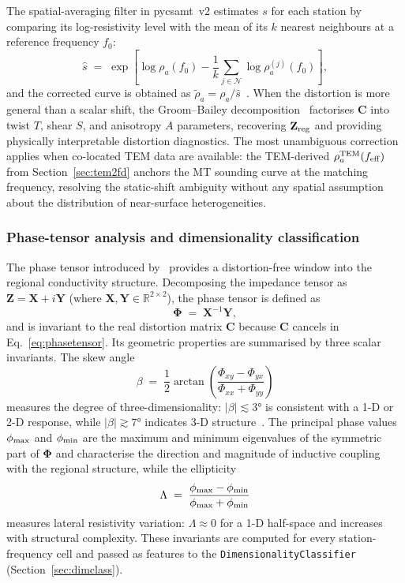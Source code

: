 \documentclass[review,12pt]{elsarticle}
\begin{document}
The spatial-averaging filter in pycsamt~v2 estimates $s$ for each station
by comparing its log-resistivity level with the mean of its $k$ nearest
neighbours at a reference frequency $f_0$:
\begin{equation}
  \hat{s} \;=\;
  \exp\!\left[
    \log\rho_a(f_0) -
    \frac{1}{k}\sum_{j\in\mathcal{N}}\log\rho_a^{(j)}(f_0)
  \right],
  \label{eq:sshat}
\end{equation}
and the corrected curve is obtained as
$\tilde{\rho}_a = \rho_a/\hat{s}$~\citep{Kouadio2023}.
When the distortion is more general than a scalar shift, the
Groom--Bailey decomposition~\citep{Groometal1989} factorises $\mathbf{C}$
into twist $T$, shear $S$, and anisotropy $A$ parameters, recovering
$\mathbf{Z}_{\rm reg}$ and providing physically interpretable distortion
diagnostics.
The most unambiguous correction applies when co-located TEM data are
available: the TEM-derived $\rho_a^{\rm TEM}(f_{\rm eff})$ from
Section~\ref{sec:tem2fd} anchors the MT sounding curve at the matching
frequency, resolving the static-shift ambiguity without any spatial
assumption about the distribution of near-surface heterogeneities.

\subsubsection{Phase-tensor analysis and dimensionality classification}

The phase tensor introduced by~\citet{Caldwell2004} provides a
distortion-free window into the regional conductivity structure.
Decomposing the impedance tensor as $\mathbf{Z} = \mathbf{X} + i\mathbf{Y}$
(where $\mathbf{X},\mathbf{Y}\in\mathbb{R}^{2\times2}$), the phase tensor
is defined as
\begin{equation}
  \boldsymbol\Phi \;=\; \mathbf{X}^{-1}\mathbf{Y},
  \label{eq:phasetensor}
\end{equation}
and is invariant to the real distortion matrix $\mathbf{C}$ because
$\mathbf{C}$ cancels in Eq.~\eqref{eq:phasetensor}.
Its geometric properties are summarised by three scalar invariants.
The skew angle
\begin{equation}
  \beta \;=\; \frac{1}{2}
  \arctan\!\left(\frac{\Phi_{xy}-\Phi_{yx}}{\Phi_{xx}+\Phi_{yy}}\right)
  \label{eq:beta}
\end{equation}
measures the degree of three-dimensionality: $|\beta|\lesssim3°$ is
consistent with a 1-D or 2-D response, while $|\beta|\gtrsim7°$ indicates
3-D structure~\citep{Bahr1991,Caldwell2004}.
The principal phase values $\phi_{\rm max}$ and $\phi_{\rm min}$ are the
maximum and minimum eigenvalues of the symmetric part of $\boldsymbol\Phi$
and characterise the direction and magnitude of inductive coupling with the
regional structure, while the ellipticity
\begin{equation}
  \Lambda \;=\; \frac{\phi_{\rm max}-\phi_{\rm min}}{\phi_{\rm max}+\phi_{\rm min}}
  \label{eq:lambda}
\end{equation}
measures lateral resistivity variation: $\Lambda\approx0$ for a 1-D
half-space and increases with structural complexity.
These invariants are computed for every station-frequency cell and passed as
features to the \texttt{DimensionalityClassifier}
(Section~\ref{sec:dimclass}).
\end{document}
